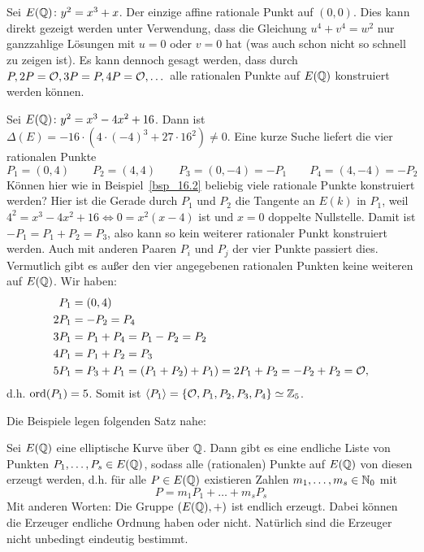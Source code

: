 \begin{bsp}
\label{bsp_16.3}
	Sei $E(\mathbb{Q})\colon y^2 = x^3+x$.
	Der einzige affine rationale Punkt auf $(0,0)$.
	Dies kann direkt gezeigt werden unter Verwendung, dass die Gleichung $u^4+v^4 = w^2$ nur ganzzahlige Lösungen mit $u=0$ oder $v=0$ hat (was auch schon nicht so schnell zu zeigen ist).
	Es kann dennoch gesagt werden, dass durch $P, 2P = \mathcal{O}, 3P = P, 4P = \mathcal{O}, \dots$ alle rationalen Punkte auf $E(\mathbb{Q})$ konstruiert werden können.
\end{bsp}

\begin{bsp}
\label{bsp_16.4}
	Sei $E(\mathbb{Q})\colon y^2 = x^3 - 4x^2 + 16$.
	Dann ist $\Delta(E) = -16 \cdot (4 \cdot (-4)^3 + 27 \cdot 16^2) \neq 0$.
	Eine kurze Suche liefert die vier rationalen Punkte
	\[
		P_1 = (0,4) \qquad P_2 = (4,4) \qquad P_3 = (0,-4) = -P_1 \qquad P_4 = (4,-4) = -P_2
	\]
	Können hier wie in Beispiel~\ref{bsp_16.2} beliebig viele rationale Punkte konstruiert werden?
	Hier ist die Gerade durch $P_1$ und $P_2$ die Tangente an $E(k)$ in $P_1$, weil $4^2 = x^3 - 4x^2 + 16 \Leftrightarrow 0 = x^2(x-4)$ ist und $x = 0$ doppelte Nullstelle.
	Damit ist $-P_1 = P_1 + P_2 = P_3$, also kann so kein weiterer rationaler Punkt konstruiert werden.
	Auch mit anderen Paaren $P_i$ und $P_j$ der vier Punkte passiert dies.
	Vermutlich gibt es außer den vier angegebenen rationalen Punkten keine weiteren auf $E(\mathbb{Q})$.
	Wir haben:
	\begin{equation}
	\begin{aligned}
		P_1 &= (0,4) \\
		2P_1 &= -P_2 = P_4 \\
		3P_1 &= P_1 + P_4 = P_1 - P_2 = P_2 \\
		4P_1 &= P_1 + P_2 = P_3 \\
		5P_1 &= P_3 + P_1 = (P_1 + P_2) + P_1) = 2P_1 + P_2 = -P_2 + P_2 = \mathcal{O},
	\end{aligned}
	\end{equation} 
	d.h. $\operatorname{ord}(P_1) = 5$.
	Somit ist $\left\langle P_1\right\rangle = \{\mathcal{O}, P_1, P_2, P_3, P_4\} \simeq \mathbb{Z}_5$.
\end{bsp}

Die Beispiele legen folgenden Satz nahe:
\begin{satz}
\label{satz_mordell} \label{satz_16.5}
	Sei $E(\mathbb{Q})$ eine elliptische Kurve über $\mathbb{Q}$.
	Dann gibt es eine endliche Liste von Punkten $P_1,\dots,P_s \in E(\mathbb{Q})$, sodass alle (rationalen) Punkte auf $E(\mathbb{Q})$ von diesen erzeugt werden, d.h. für alle $P \in E(\mathbb{Q})$ existieren Zahlen $m_1,\dots,m_s \in \mathbb{N}_0$ mit
	\[
		P = m_1 P_1 + \dots + m_s P_s
	\]
	Mit anderen Worten: Die Gruppe $(E(\mathbb{Q}),+)$ ist endlich erzeugt.
	Dabei können die Erzeuger endliche Ordnung haben oder nicht.
	Natürlich sind die Erzeuger nicht unbedingt eindeutig bestimmt.
\end{satz}

